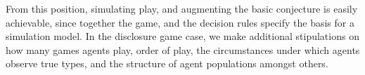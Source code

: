 From this position, simulating play, and augmenting the basic conjecture is easily achievable, since together the game, and the decision rules specify the basis for a simulation model. In the disclosure game case, we make additional stipulations on how many games agents play, order of play, the circumstances under which agents observe true types, and the structure of agent populations amongst others. 